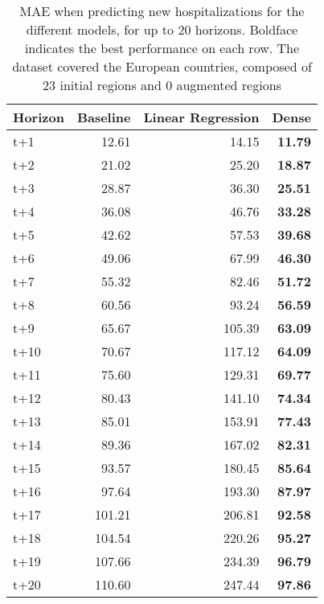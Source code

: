 \begin{table}[H]
\centering
\caption{MAE when predicting new hospitalizations for the different models, for up to 20 horizons. Boldface indicates the best performance on each row. The dataset covered the European countries, composed of 23 initial regions and 0 augmented regions }
\label{tab:MAE_comparison}
\begin{tabular}{lrrr}
\toprule
Horizon &  Baseline &  Linear Regression &  Dense \\
\midrule
t+1  & 12.61  & 14.15  & \textbf{11.79}  \\
t+2  & 21.02  & 25.20  & \textbf{18.87}  \\
t+3  & 28.87  & 36.30  & \textbf{25.51}  \\
t+4  & 36.08  & 46.76  & \textbf{33.28}  \\
t+5  & 42.62  & 57.53  & \textbf{39.68}  \\
t+6  & 49.06  & 67.99  & \textbf{46.30}  \\
t+7  & 55.32  & 82.46  & \textbf{51.72}  \\
t+8  & 60.56  & 93.24  & \textbf{56.59}  \\
t+9  & 65.67  & 105.39  & \textbf{63.09}  \\
t+10  & 70.67  & 117.12  & \textbf{64.09}  \\
t+11  & 75.60  & 129.31  & \textbf{69.77}  \\
t+12  & 80.43  & 141.10  & \textbf{74.34}  \\
t+13  & 85.01  & 153.91  & \textbf{77.43}  \\
t+14  & 89.36  & 167.02  & \textbf{82.31}  \\
t+15  & 93.57  & 180.45  & \textbf{85.64}  \\
t+16  & 97.64  & 193.30  & \textbf{87.97}  \\
t+17  & 101.21  & 206.81  & \textbf{92.58}  \\
t+18  & 104.54  & 220.26  & \textbf{95.27}  \\
t+19  & 107.66  & 234.39  & \textbf{96.79}  \\
t+20  & 110.60  & 247.44  & \textbf{97.86}  \\

\bottomrule
\end{tabular}
\end{table}
